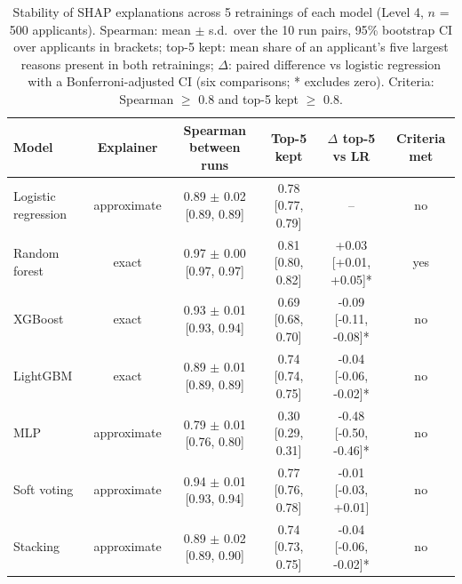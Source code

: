 \begin{table}[t]
\caption{Stability of SHAP explanations across 5 retrainings of each model (Level 4, $n$ = 500 applicants). Spearman: mean $\pm$ s.d.\ over the 10 run pairs, 95\% bootstrap CI over applicants in brackets; top-5 kept: mean share of an applicant's five largest reasons present in both retrainings; $\Delta$: paired difference vs logistic regression with a Bonferroni-adjusted CI (six comparisons; * excludes zero). Criteria: Spearman $\ge$ 0.8 and top-5 kept $\ge$ 0.8.}
\label{tab:rq3_stability}
\centering
\small
\begin{tabular}{lccccc}
\hline
Model & Explainer & Spearman between runs & Top-5 kept & $\Delta$ top-5 vs LR & Criteria met \\
\hline
Logistic regression & approximate & 0.89 $\pm$ 0.02 [0.89, 0.89] & 0.78 [0.77, 0.79] & -- & no \\
Random forest & exact & 0.97 $\pm$ 0.00 [0.97, 0.97] & 0.81 [0.80, 0.82] & +0.03 [+0.01, +0.05]* & yes \\
XGBoost & exact & 0.93 $\pm$ 0.01 [0.93, 0.94] & 0.69 [0.68, 0.70] & -0.09 [-0.11, -0.08]* & no \\
LightGBM & exact & 0.89 $\pm$ 0.01 [0.89, 0.89] & 0.74 [0.74, 0.75] & -0.04 [-0.06, -0.02]* & no \\
MLP & approximate & 0.79 $\pm$ 0.01 [0.76, 0.80] & 0.30 [0.29, 0.31] & -0.48 [-0.50, -0.46]* & no \\
Soft voting & approximate & 0.94 $\pm$ 0.01 [0.93, 0.94] & 0.77 [0.76, 0.78] & -0.01 [-0.03, +0.01] & no \\
Stacking & approximate & 0.89 $\pm$ 0.02 [0.89, 0.90] & 0.74 [0.73, 0.75] & -0.04 [-0.06, -0.02]* & no \\
\hline
\end{tabular}
\end{table}